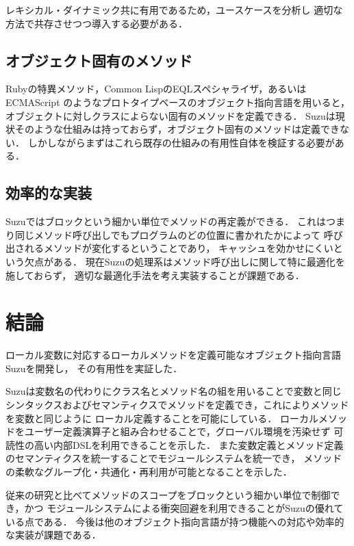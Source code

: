 \documentclass[a4paper,11pt,dvipdfmx]{jreport}
\begin{document}
レキシカル・ダイナミック共に有用であるため，ユースケースを分析し
適切な方法で共存させつつ導入する必要がある．

\section{オブジェクト固有のメソッド}

Rubyの特異メソッド，Common LispのEQLスペシャライザ，あるいはECMAScript
\cite{ECMAScript}のようなプロトタイプベースのオブジェクト指向言語を用いると，
オブジェクトに対しクラスによらない固有のメソッドを定義できる．
Suzuは現状そのような仕組みは持っておらず，オブジェクト固有のメソッドは定義できない．
しかしながらまずはこれら既存の仕組みの有用性自体を検証する必要がある．

\section{効率的な実装}

Suzuではブロックという細かい単位でメソッドの再定義ができる．
これはつまり同じメソッド呼び出しでもプログラムのどの位置に書かれたかによって
呼び出されるメソッドが変化するということであり，
キャッシュを効かせにくいという欠点がある．
現在Suzuの処理系はメソッド呼び出しに関して特に最適化を施しておらず，
適切な最適化手法を考え実装することが課題である．


\chapter{結論}
\label{chapter:conclusion}

ローカル変数に対応するローカルメソッドを定義可能なオブジェクト指向言語Suzuを開発し，
その有用性を実証した．

Suzuは変数名の代わりにクラス名とメソッド名の組を用いることで変数と同じ
シンタックスおよびセマンティクスでメソッドを定義でき，これによりメソッドを変数と同じように
ローカル定義することを可能にしている．
ローカルメソッドをユーザー定義演算子と組み合わせることで，グローバル環境を汚染せず
可読性の高い内部DSLを利用できることを示した．
また変数定義とメソッド定義のセマンティクスを統一することでモジュールシステムを統一でき，
メソッドの柔軟なグループ化・共通化・再利用が可能となることを示した．

従来の研究と比べてメソッドのスコープをブロックという細かい単位で制御でき，かつ
モジュールシステムによる衝突回避を利用できることがSuzuの優れている点である．
今後は他のオブジェクト指向言語が持つ機能への対応や効率的な実装が課題である．
\end{document}

